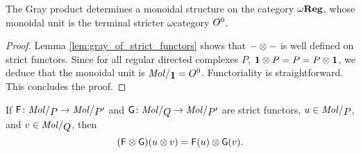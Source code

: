 \begin{cor} \label{cor:gray_prodcut_omegareg_monoidal}
    The Gray product determines a monoidal structure on the category \( \omega\mathbf{Reg} \), whose monoidal unit is the terminal stricter \( \omega \)\nbd category \( O^{0} \).
\end{cor}
\begin{proof}
    Lemma \ref{lem:gray_of_strict_functors} shows that \( - \otimes - \) is well defined on strict functors. 
    Since for all regular directed complexes \( P \), \( \mathbf{1} \otimes P = P = P \otimes \mathbf{1} \), we deduce that the monoidal unit is \( \molecin{\pt} = \globe{0} \).
    Functoriality is straightforward.
    This concludes the proof.
\end{proof}

\begin{rmk}
    If \( \F \colon \molecin{P} \to \molecin{P'} \) and \( \G \colon \molecin{Q} \to \molecin{P'} \) are strict functors, \( u \in \molecin{P} \), and \( v \in \molecin{Q} \), then 
    \begin{equation*}
       (\mathsf{F} \otimes \mathsf{G})(u \otimes v) = \mathsf{F}(u) \otimes \mathsf{G}(v). 
    \end{equation*}
\end{rmk}


